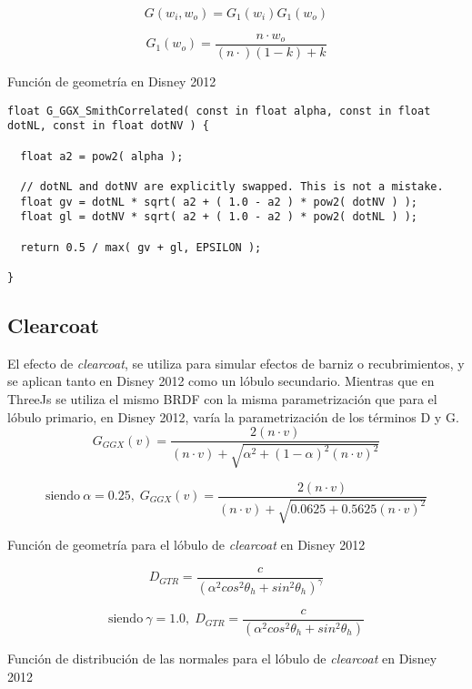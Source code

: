    $$
    G(w_i, w_o) = G_1(w_i)G_1(w_o)
    $$

    \begin{eqfloat}[!htb]
      \begin{equation}
        G_1(w_o) = \frac{n\cdot{w_o}}{(n\cdot) (1 - k) + k}
      \end{equation}
    \caption{Funci\'on de geometr\'ia en Disney 2012}
    \end{eqfloat}
    \singlespacing

  \begin{lstlisting}[caption=Clase MeshClothMaterial]
float G_GGX_SmithCorrelated( const in float alpha, const in float dotNL, const in float dotNV ) {

  float a2 = pow2( alpha );

  // dotNL and dotNV are explicitly swapped. This is not a mistake.
  float gv = dotNL * sqrt( a2 + ( 1.0 - a2 ) * pow2( dotNV ) );
  float gl = dotNV * sqrt( a2 + ( 1.0 - a2 ) * pow2( dotNL ) );

  return 0.5 / max( gv + gl, EPSILON );

}
  \end{lstlisting}

    \subsection{Clearcoat}
    El efecto de \textit{clearcoat}, se utiliza para simular efectos de barniz o recubrimientos, y se aplican tanto en Disney
    2012 como un l\'obulo secundario. Mientras que en ThreeJs se utiliza el mismo BRDF con la misma parametrizaci\'on que para
    el l\'obulo primario, en Disney 2012, var\'ia la parametrizaci\'on de los t\'erminos D y G.\\

    $$
    G_{GGX}(v) = \frac
    {2 (n \cdot{v})}
    {(n \cdot{v}) + \sqrt{ \alpha^2 + (1 - \alpha)^2 (n \cdot{v})^2 }}
    $$
    \begin{eqfloat}[!htb]
      \begin{equation}
      \textrm{siendo}\ \alpha=0.25,\;
      G_{GGX}(v) = \frac
      {2 (n \cdot{v})}
      {(n \cdot{v}) + \sqrt{ 0.0625 + 0.5625 (n \cdot{v})^2 }}
      \end{equation}
    \caption{Funci\'on de geometr\'ia para el l\'obulo de \textit{clearcoat} en Disney 2012}
    \end{eqfloat}
    \singlespacing

    $$
    D_{GTR} = \frac
    {c}
    {(\alpha^2 cos^2 \theta_h + sin^2 \theta_h)^\gamma}
    $$
    \begin{eqfloat}[!htb]
      \begin{equation}
      \textrm{siendo}\ \gamma=1.0,\;
      D_{GTR} = \frac
      {c}
      {(\alpha^2 cos^2 \theta_h + sin^2 \theta_h)}
      \end{equation}
    \caption{Funci\'on de distribuci\'on de las normales para el l\'obulo de \textit{clearcoat} en Disney 2012}
    \end{eqfloat}
    \singlespacing
    
